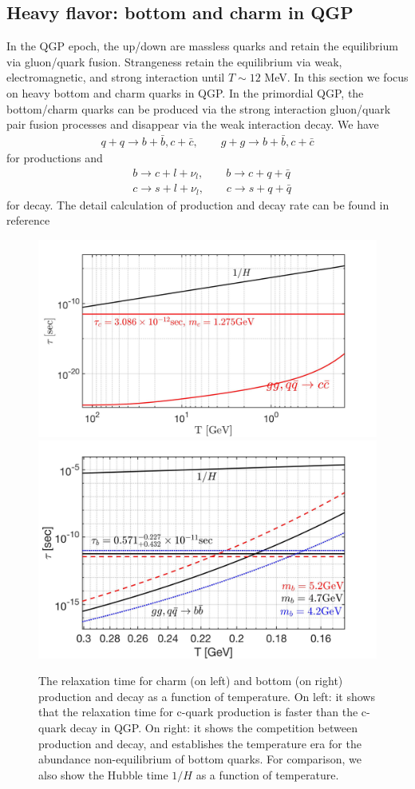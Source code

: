 \documentclass[universe,article,submit,moreauthors,pdftex,a4paper]{Definitions/mdpi}
\newcommand*{\xblue}{\color{blue}}
\begin{document}
\subsection{Heavy flavor: bottom and charm in QGP}
\noindent In the QGP epoch, the up/down are massless quarks and retain the equilibrium via gluon/quark fusion. Strangeness retain the equilibrium via weak, electromagnetic, and strong interaction until $T\sim12$ MeV. In this section we focus on heavy bottom and charm quarks in QGP. 
In the primordial QGP, the bottom/charm quarks can be produced via the strong interaction gluon/quark pair fusion processes and disappear via the weak interaction decay. We have
\begin{align}
    q+q\longrightarrow b+\bar b, c+\bar c,\qquad g+g\longrightarrow b+\bar b, c+\bar c
\end{align}
for productions and 
\begin{align}
    &b\longrightarrow c+l+\nu_l, \qquad b\longrightarrow c+q+\bar{q}\\
&c\longrightarrow s+l+\nu_l,\qquad c\longrightarrow s+q+\bar{q}
\end{align}
for decay. The detail calculation of production and decay rate can be found in {\xblue reference}
\begin{figure} %
\centering
\includegraphics[width=0.54\linewidth]{BottomCharm.jpg}\includegraphics[width=0.5\linewidth]{BQuarkReactionTime_bottom.jpg}
\caption{ The relaxation time for charm (on left) and bottom (on right) production and decay as a function of temperature. On left: it shows that the relaxation time for c-quark production is faster than the c-quark decay in QGP. On right: it shows the competition between production and decay, and  establishes the temperature era for the abundance non-equilibrium of bottom quarks. For comparison, we also show the Hubble time $1/H$ as a function of temperature.}
\label{BCreaction_fig}
\end{figure}
\end{document}
